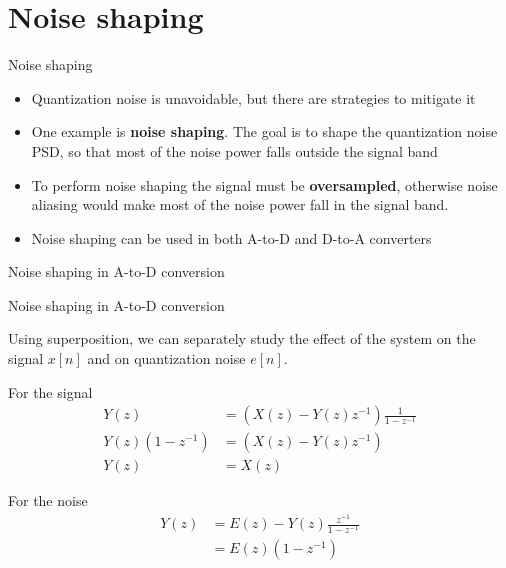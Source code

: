 \documentclass[10pt, aspectratio=169, handout]{beamer}
\begin{document}
\section{Noise shaping}
\begin{frame}{Noise shaping}

\begin{itemize}
	\item Quantization noise is unavoidable, but there are strategies to mitigate it
	\item One example is \textbf{noise shaping}. The goal is to shape the quantization noise PSD, so that most of the noise power falls outside the signal band
	\item To perform noise shaping the signal must be \textbf{oversampled}, otherwise noise aliasing would make most of the noise power fall in the signal band.
	\item Noise shaping can be used in both A-to-D and D-to-A converters
\end{itemize}
\end{frame}

\begin{frame}{Noise shaping in A-to-D conversion}
\begin{center}
	\def\ALL{1}
	\resizebox{0.6\textwidth}{!}{}
\end{center}
\end{frame}

%
\begin{frame}{Noise shaping in A-to-D conversion}
\vspace{-0.3cm}
\begin{center}
	\let\ALL\undefined
	\resizebox{0.4\textwidth}{!}{}
\end{center}

Using superposition, we can separately study the effect of the system on the signal $x[n]$ and on quantization noise $e[n]$. 

For the signal
\begin{align*}
Y(z) &= (X(z) - Y(z)z^{-1})\frac{1}{1 - z^{-1}} \\
Y(z)(1 - z^{-1}) &= (X(z) - Y(z)z^{-1}) \\
Y(z) &= X(z) \tag{signal is unaffected}
\end{align*}

For the noise
\begin{align*}
Y(z) &= E(z) - Y(z)\frac{z^{-1}}{1 - z^{-1}} \\
&= E(z)(1 - z^{-1}) \tag{noise is filtered}
\end{align*}
\end{frame}
\end{document}
